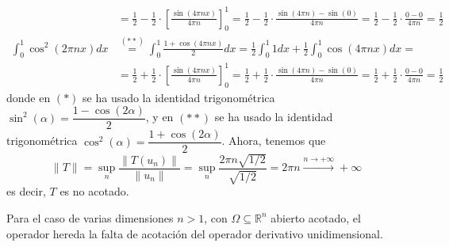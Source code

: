\begin{ejercicio}
\begin{description}
\begin{align*}
            &= \frac{1}{2} - \frac{1}{2} \cdot \left[ \frac{\sin(4\pi n x)}{4\pi n} \right]_0^1 = \frac{1}{2} - \frac{1}{2} \cdot \frac{\sin(4\pi n) - \sin(0)}{4\pi n} = \frac{1}{2} - \frac{1}{2} \cdot \frac{0 - 0}{4\pi n} = \frac{1}{2} \\
            \int_0^1 \cos^2(2\pi n x) dx &\overset{(**)}{=} \int_0^1 \frac{1 + \cos(4\pi n x)}{2} dx= \frac{1}{2} \int_0^1 1 dx + \frac{1}{2} \int_0^1 \cos(4\pi n x) dx= \\
            &= \frac{1}{2} + \frac{1}{2} \cdot \left[ \frac{\sin(4\pi n x)}{4\pi n} \right]_0^1 = \frac{1}{2} + \frac{1}{2} \cdot \frac{\sin(4\pi n) - \sin(0)}{4\pi n} = \frac{1}{2} + \frac{1}{2} \cdot \frac{0 - 0}{4\pi n} = \frac{1}{2}
        \end{align*}
        donde en $(*)$ se ha usado la identidad trigonométrica $\sin^2(\alpha) = \dfrac{1 - \cos(2\alpha)}{2}$, y en $(**)$ se ha usado la identidad trigonométrica $\cos^2(\alpha) = \dfrac{1 + \cos(2\alpha)}{2}$. Ahora, tenemos que 
        \begin{equation*}
            \|T\|= \sup_{n} \frac{\|T(u_n)\|}{\|u_n\|} = \sup_{n} \frac{2\pi n \sqrt{1/2}}{\sqrt{1/2}} = 2\pi n \xrightarrow{n \to +\infty} +\infty
        \end{equation*}
        es decir, $T$ es no acotado. \\

    \end{description}
    Para el caso de varias dimensiones $n>1$, con $\Omega \subseteq \mathbb{R}^n$ abierto acotado, el operador 
    hereda la falta de acotación del operador derivativo unidimensional.
\end{ejercicio}
